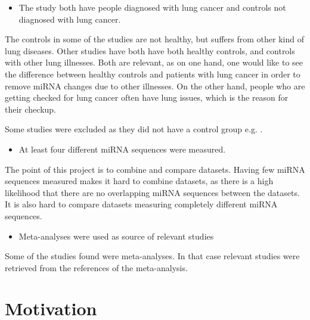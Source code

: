 \begin{itemize}
    \item The study both have people diagnosed with lung cancer and controls not diagnosed with lung cancer.
\end{itemize}

The controls in some of the studies are not healthy, but suffers from other kind of lung diseases. Other studies have both have both healthy controls, and controls with other lung illnesses. Both are relevant, as on one hand, one would like to see the difference between healthy controls and patients with lung cancer in order to remove miRNA changes due to other illnesses. On the other hand, people who are getting checked for lung cancer often have lung issues, which is the reason for their checkup.

Some studies were excluded as they did not have a control group e.g. \citet{Mitchell2017}.

\begin{itemize}
    \item At least four different miRNA sequences were measured.
\end{itemize}

The point of this project is to combine and compare datasets. Having few miRNA sequences measured makes it hard to combine datasets, as there is a high likelihood that there are no overlapping miRNA sequences between the datasets. It is also hard to compare datasets measuring completely different miRNA sequences.

\begin{itemize}
    \item Meta-analyses were used as source of relevant studies
\end{itemize}

Some of the studies found were meta-analyses. In that case relevant studies were retrieved from the references of the meta-analysis.

\section{Motivation}
\label{sec:no2}

